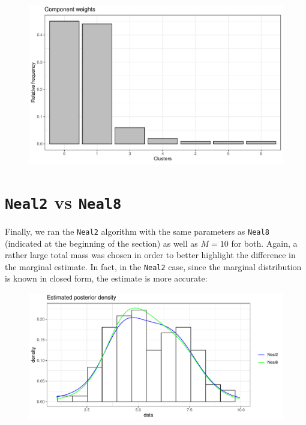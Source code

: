 \clearpage

\begin{figure}[h]
	\centering
	\includegraphics[scale=0.5]{etc/barplotM1m3.pdf}
\end{figure}



\section{\texttt{Neal2} vs \texttt{Neal8}}
Finally, we ran the \verb|Neal2| algorithm with the same parameters as \verb|Neal8| (indicated at the beginning of the section) as well as $M=10$ for both.
Again, a rather large total mass was chosen in order to better highlight the difference in the marginal estimate.
In fact, in the \verb|Neal2| case, since the marginal distribution is known in closed form, the estimate is more accurate:

\begin{figure}[h]
	\centering
	\includegraphics[scale=0.7]{etc/neal2_M10.pdf}
\end{figure}
